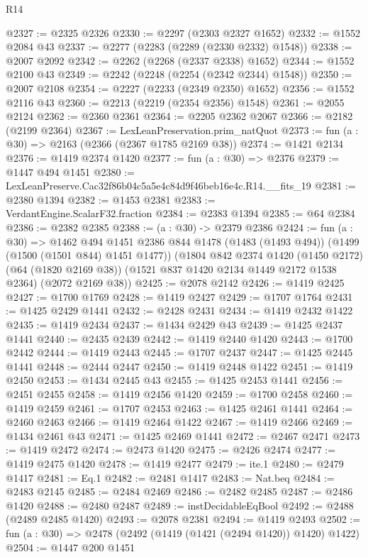 \begin{lexlean}{R14}
\begin{coremodule}
@2327 := @2325 @2326
@2330 := @2297 (@2303 @2327 @1652)
@2332 := @1552 @2084 @43
@2337 := @2277 (@2283 (@2289 (@2330 @2332) @1548))
@2338 := @2007 @2092
@2342 := @2262 (@2268 (@2337 @2338) @1652)
@2344 := @1552 @2100 @43
@2349 := @2242 (@2248 (@2254 (@2342 @2344) @1548))
@2350 := @2007 @2108
@2354 := @2227 (@2233 (@2349 @2350) @1652)
@2356 := @1552 @2116 @43
@2360 := @2213 (@2219 (@2354 @2356) @1548)
@2361 := @2055 @2124
@2362 := @2360 @2361
@2364 := @2205 @2362 @2067
@2366 := @2182 (@2199 @2364)
@2367 := LexLeanPreservation.prim_natQuot
@2373 := fun (a : @30) => @2163 (@2366 (@2367 @1785 @2169 @38))
@2374 := @1421 @2134
@2376 := @1419 @2374 @1420
@2377 := fun (a : @30) => @2376
@2379 := @1447 @494 @1451
@2380 := LexLeanPreserve.Cac32f86b04c5a5e4c84d9f46beb16e4c.R14.__fits_19
@2381 := @2380 @1394
@2382 := @1453 @2381
@2383 := VerdantEngine.ScalarF32.fraction
@2384 := @2383 @1394
@2385 := @64 @2384
@2386 := @2382 @2385
@2388 := (a : @30) -> @2379 @2386
@2424 := fun (a : @30) =>
  @1462
    @494
    @1451
    @2386
    @844
    @1478
    (@1483 (@1493 @494))
    (@1499 (@1500 (@1501 @844) @1451 @1477))
    (@1804
      @842
      @2374
      @1420
      (@1450 @2172)
      (@64 (@1820 @2169 @38))
      (@1521 @837 @1420 @2134 @1449 @2172 @1538 @2364)
      (@2072 @2169 @38))
@2425 := @2078 @2142
@2426 := @1419 @2425
@2427 := @1700 @1769
@2428 := @1419 @2427
@2429 := @1707 @1764
@2431 := @1425 @2429 @1441
@2432 := @2428 @2431
@2434 := @1419 @2432 @1422
@2435 := @1419 @2434
@2437 := @1434 @2429 @43
@2439 := @1425 @2437 @1441
@2440 := @2435 @2439
@2442 := @1419 @2440 @1420
@2443 := @1700 @2442
@2444 := @1419 @2443
@2445 := @1707 @2437
@2447 := @1425 @2445 @1441
@2448 := @2444 @2447
@2450 := @1419 @2448 @1422
@2451 := @1419 @2450
@2453 := @1434 @2445 @43
@2455 := @1425 @2453 @1441
@2456 := @2451 @2455
@2458 := @1419 @2456 @1420
@2459 := @1700 @2458
@2460 := @1419 @2459
@2461 := @1707 @2453
@2463 := @1425 @2461 @1441
@2464 := @2460 @2463
@2466 := @1419 @2464 @1422
@2467 := @1419 @2466
@2469 := @1434 @2461 @43
@2471 := @1425 @2469 @1441
@2472 := @2467 @2471
@2473 := @1419 @2472
@2474 := @2473 @1420
@2475 := @2426 @2474
@2477 := @1419 @2475 @1420
@2478 := @1419 @2477
@2479 := ite.{1}
@2480 := @2479 @1417
@2481 := Eq.{1}
@2482 := @2481 @1417
@2483 := Nat.beq
@2484 := @2483 @2145
@2485 := @2484 @2469
@2486 := @2482 @2485
@2487 := @2486 @1420
@2488 := @2480 @2487
@2489 := instDecidableEqBool
@2492 := @2488 (@2489 @2485 @1420)
@2493 := @2078 @2381
@2494 := @1419 @2493
@2502 := fun (a : @30) => @2478 (@2492 (@1419 (@1421 (@2494 @1420)) @1420) @1422)
@2504 := @1447 @200 @1451

\end{coremodule}
\end{lexlean}
